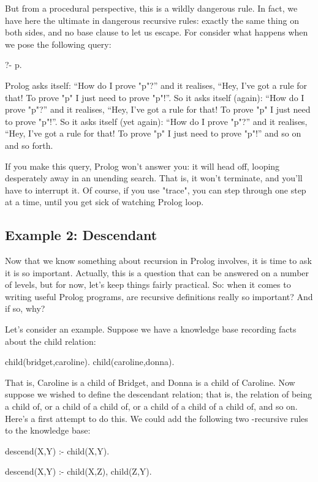 But from a procedural perspective, this is a wildly dangerous rule. In
fact, we have here the ultimate in dangerous recursive rules: exactly
the same thing on both sides, and no base clause to let us escape.
For consider what happens when we pose the following query:
\begin{LPNcodedisplay}
?- p.
\end{LPNcodedisplay}
Prolog asks itself: ``How do I prove "p"?''  and it realises, ``Hey,
I've got a rule for that!  To prove "p" I just need to prove "p"!''.
So it asks itself (again): ``How do I prove "p"?''  and it realises,
``Hey, I've got a rule for that!  To prove "p" I just need to prove
"p"!''.  So it asks itself (yet again): ``How do I prove "p"?''  and
it realises, ``Hey, I've got a rule for that!  To prove "p" I just
need to prove "p"!''  and so on and so forth.

If you make this query, Prolog won't answer you: it will head off,
looping desperately away in an unending search.  That is, it won't
terminate, and you'll have to interrupt it. Of course, if you use
"trace", you can step through one step at a time, until you get
sick of watching Prolog loop.

\subsection*{Example 2: Descendant}\label{SUBSEC.L3.EX2}



Now that we know something about  recursion in Prolog
involves, it is time to ask  it is so important.  Actually,
this is a question that can be answered on a number of levels, but for
now, let's keep things fairly practical.  So: when it comes to writing
useful Prolog programs, are recursive definitions really so important?
And if so, why?

Let's consider an example.  Suppose we have a knowledge base recording
facts about the child relation:
\begin{LPNcodedisplay}
child(bridget,caroline).
child(caroline,donna).
\end{LPNcodedisplay}
That is, Caroline is a child of Bridget, and Donna is a child of
Caroline. Now suppose we wished to define the descendant relation;
that is, the relation of being a child of, or a child of a child of,
or a child of a child of a child of, and so on.  Here's a first attempt to
do this.  We could add the following two -recursive rules to
the knowledge base:
\begin{LPNcodedisplay}
descend(X,Y) :- child(X,Y).

descend(X,Y) :- child(X,Z),
                 child(Z,Y).
\end{LPNcodedisplay}


